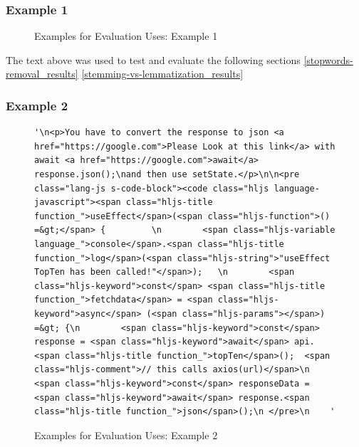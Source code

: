 \subsubsection{Example 1} \label{example-1}
\begin{figure}[H]
  \noindent{}
  \caption{Examples for Evaluation Uses: Example 1}
  \label{fig:example-1}
\end{figure}

\noindent The text above was used to test and evaluate the following sections \ref{stopwords-removal_results} \ref{stemming-vs-lemmatization_results}

\newpage
\subsubsection{Example 2} \label{example-2}
\hspace{0.5cm}
\begin{figure}[H]
  \begin{lstlisting}
'\n<p>You have to convert the response to json <a href="https://google.com">Please Look at this link</a> with await <a href="https://google.com">await</a> response.json();\nand then use setState.</p>\n\n<pre class="lang-js s-code-block"><code class="hljs language-javascript"><span class="hljs-title function_">useEffect</span>(<span class="hljs-function">() =&gt;</span> {         \n        <span class="hljs-variable language_">console</span>.<span class="hljs-title function_">log</span>(<span class="hljs-string">"useEffect TopTen has been called!"</span>);   \n        <span class="hljs-keyword">const</span> <span class="hljs-title function_">fetchdata</span> = <span class="hljs-keyword">async</span> (<span class="hljs-params"></span>) =&gt; {\n        <span class="hljs-keyword">const</span> response = <span class="hljs-keyword">await</span> api.<span class="hljs-title function_">topTen</span>();  <span class="hljs-comment">// this calls axios(url)</span>\n        <span class="hljs-keyword">const</span> responseData = <span class="hljs-keyword">await</span> response.<span class="hljs-title function_">json</span>();\n </pre>\n    '
        \end{lstlisting}
  \caption{Examples for Evaluation Uses: Example 2}
  \label{fig:example-2}
\end{figure}


